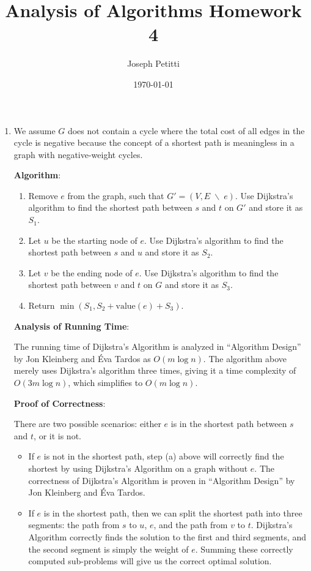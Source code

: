 \documentclass[a4paper, 10pt]{article}
\title{Analysis of Algorithms Homework 4}
\author{Joseph Petitti}
\date{\today}
\begin{document}
\IncMargin{1em}

\maketitle

\begin{enumerate}
	\item 
		We assume $G$ does not contain a cycle where the total cost of all edges
		in the cycle is negative because the concept of a shortest path is
		meaningless in a graph with negative-weight cycles.

		\textbf{Algorithm}:

		\begin{enumerate}
			\item Remove $e$ from the graph, such that $G' = (V, E \; \backslash
				\; e)$. Use Dijkstra's algorithm to find the shortest path
				between $s$ and $t$ on $G'$ and store it as $S_1$.
			\item Let $u$ be the starting node of $e$. Use Dijkstra's algorithm
				to find the shortest path between $s$ and $u$ and store it as
				$S_2$.
			\item Let $v$ be the ending node of $e$. Use Dijkstra's algorithm to
				find the shortest path between $v$ and $t$ on $G$ and store it
				as $S_3$.
			\item Return $\min ( S_1, S_2 + \textrm{value}(e) + S_3 )$.
		\end{enumerate}

		\textbf{Analysis of Running Time}:

		The running time of Dijkstra's Algorithm is analyzed in ``Algorithm
		Design'' by Jon Kleinberg and Éva Tardos as $O(m \log n)$. The algorithm
		above merely uses Dijkstra's algorithm three times, giving it a time
		complexity of $O(3m \log n)$, which simplifies to $O(m \log n)$.

		\textbf{Proof of Correctness}:

		There are two possible scenarios: either $e$ is in the shortest path
		between $s$ and $t$, or it is not.

		\begin{itemize}
			\item If $e$ is not in the shortest path, step (a) above will
				correctly find the shortest by using Dijkstra's Algorithm on a
				graph without $e$. The correctness of Dijkstra's Algorithm is
				proven in ``Algorithm Design'' by Jon Kleinberg and Éva Tardos.
			\item If $e$ is in the shortest path, then we can split the shortest
				path into three segments: the path from $s$ to $u$, $e$, and the
				path from $v$ to $t$. Dijkstra's Algorithm correctly finds the
				solution to the first and third segments, and the second segment
				is simply the weight of $e$. Summing these correctly computed
				sub-problems will give us the correct optimal solution.
		\end{itemize}


\end{enumerate}
\end{document}
